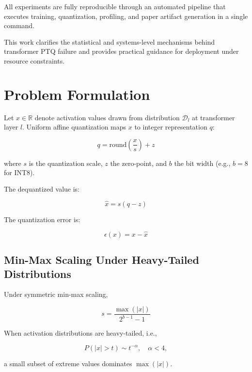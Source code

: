 \documentclass[conference]{IEEEtran}
\begin{document}
All experiments are fully reproducible through an automated pipeline that executes training, quantization, profiling, and paper artifact generation in a single command.

This work clarifies the statistical and systems-level mechanisms behind transformer PTQ failure and provides practical guidance for deployment under resource constraints.
\section{Problem Formulation}

Let $x \in \mathbb{R}$ denote activation values drawn from distribution $\mathcal{D}_l$ at transformer layer $l$. Uniform affine quantization maps $x$ to integer representation $q$:

\begin{equation}
q = \mathrm{round}\left(\frac{x}{s}\right) + z
\end{equation}

where $s$ is the quantization scale, $z$ the zero-point, and $b$ the bit width (e.g., $b=8$ for INT8).

The dequantized value is:

\begin{equation}
\hat{x} = s (q - z)
\end{equation}

The quantization error is:

\begin{equation}
\epsilon(x) = x - \hat{x}
\end{equation}

\subsection{Min-Max Scaling Under Heavy-Tailed Distributions}

Under symmetric min-max scaling,

\begin{equation}
s = \frac{\max(|x|)}{2^{b-1}-1}
\end{equation}

When activation distributions are heavy-tailed, i.e.,

\begin{equation}
P(|x| > t) \sim t^{-\alpha}, \quad \alpha < 4,
\end{equation}

a small subset of extreme values dominates $\max(|x|)$.
\end{document}
